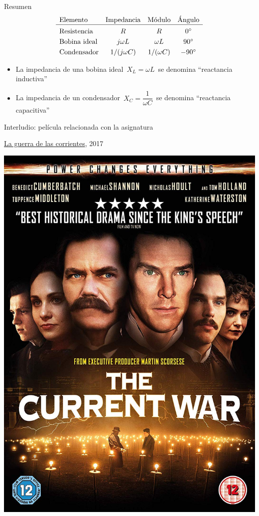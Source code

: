 \documentclass[aspectratio=169, usenames,svgnames,dvipsnames]{beamer}
\begin{document}
\begin{frame}{Resumen}
\vspace{7mm}
\[
  \begin{array}{lccc}
    \text{Elemento} & \text{Impedancia} & \text{Módulo} & \text{Ángulo}\\
    \hline\\[-8pt]
    \text{Resistencia} & R & R & \ang{0}\\[3pt]
    \text{Bobina ideal} & j \omega L & \omega L & \ang{90}\\[3pt]
     \text{Condensador} & 1/(j \omega C) & 1/(\omega C) & \ang{-90}\\
  \end{array}
\]

\vspace*{12mm}
\begin{itemize}
    \item La impedancia de una bobina ideal $\, X_L=\omega L \,$ se denomina ``reactancia inductiva''

    \vspace{3mm}
    \item La impedancia de un condensador $\, X_C=\dfrac{1}{\omega C} \,$ se denomina ``reactancia capacitiva''
\end{itemize}

\end{frame}


\begin{frame}{Interludio: \hspace{3mm}película relacionada con la asignatura}
    \begin{center}
    \href{https://www.youtube.com/watch?v=2FTxKFsWz60}{La guerra de las corrientes}, 2017
    
    \includegraphics[width=0.38\linewidth]{../figs/War_of_currents.jpg}
    \end{center}
\end{frame}
\end{document}
